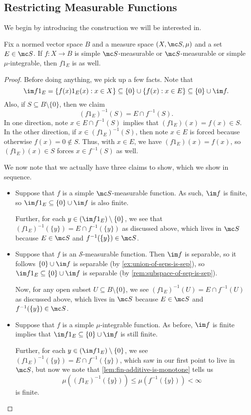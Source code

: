 \documentclass[../notes.tex]{subfiles}
\begin{document}
\subsection{Restricting Measurable Functions}
We begin by introducing the construction we will be interested in.
\begin{lemma} \label{lem:restrict-meas-functions}
	Fix a normed vector space $B$ and a measure space $(X,\mc S,\mu)$ and a set $E\in\mc S$. If $f\colon X\to B$ is simple $\mc S$-measurable or $\mc S$-measurable or simple $\mu$-integrable, then $f1_E$ is as well.
\end{lemma}
\begin{proof}
	Before doing anything, we pick up a few facts. Note that
	\[\im f1_E=\{f(x)1_E(x):x\in X\}\subseteq\{0\}\cup\{f(x):x\in E\}\subseteq\{0\}\cup\im f.\]
	Also, if $S\subseteq B\setminus\{0\}$, then we claim
	\[(f1_E)^{-1}(S)=E\cap f^{-1}(S).\]
	In one direction, note $x\in E\cap f^{-1}(S)$ implies that $(f1_E)(x)=f(x)\in S$. In the other direction, if $x\in(f1_E)^{-1}(S)$, then note $x\in E$ is forced because otherwise $f(x)=0\notin S$. Thus, with $x\in E$, we have $(f1_E)(x)=f(x)$, so $(f1_E)(x)\in S$ forces $x\in f^{-1}(S)$ as well.

	We now note that we actually have three claims to show, which we show in sequence.
	\begin{itemize}
		\item Suppose that $f$ is a simple $\mc S$-measurable function. As such, $\im f$ is finite, so $\im f1_E\subseteq\{0\}\cup\im f$ is also finite.
		
		Further, for each $y\in(\im f1_E)\setminus\{0\}$, we see that $(f1_E)^{-1}(\{y\})=E\cap f^{-1}(\{y\})$ as discussed above, which lives in $\mc S$ because $E\in\mc S$ and $f^{-1}(\{y\})\in\mc S$.
		\item Suppose that $f$ is an $\mathcal S$-measurable function. Then $\im f$ is separable, so it follows $\{0\}\cup\im f$ is separable (by \autoref{ex:union-of-seps-is-sep}), so $\im f1_E\subseteq\{0\}\cup\im f$ is separable (by \autoref{rem:subspace-of-sep-is-sep}).

		Now, for any open subset $U\subseteq B\setminus\{0\}$, we see $(f1_E)^{-1}(U)=E\cap f^{-1}(U)$ as discussed above, which lives in $\mc S$ because $E\in\mc S$ and $f^{-1}(\{y\})\in\mc S$.
		\item Suppose that $f$ is a simple $\mu$-integrable function. As before, $\im f$ is finite implies that $\im f1_E\subseteq\{0\}\cup\im f$ is still finite.

		Further, for each $y\in(\im f1_E)\setminus\{0\}$, we see $(f1_E)^{-1}(\{y\})=E\cap f^{-1}(\{y\})$, which saw in our first point to live in $\mc S$, but now we note that \autoref{lem:fin-additive-is-monotone} tells us
		\[\mu\left((f1_E)^{-1}(\{y\})\right)\le\mu\left(f^{-1}(\{y\})\right)<\infty\]
		is finite.
		\qedhere
	\end{itemize}
\end{proof}
\end{document}
